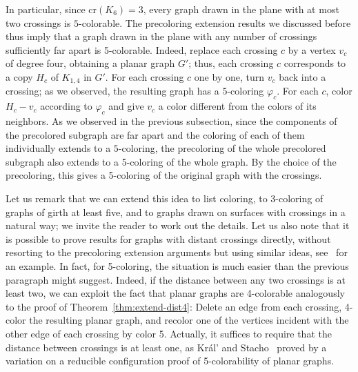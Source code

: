 \documentclass[12pt,twoside,openright,a4paper]{book}
\newcommand{\crs}{\text{cr}}
\begin{document}
In particular, since $\crs(K_6)=3$, every graph drawn in the plane with at most two crossings is $5$-colorable.
The precoloring extension results we discussed before thus imply that a graph drawn in the plane
with any number of crossings sufficiently far apart is 5-colorable.
Indeed, replace each crossing $c$ by a vertex $v_c$ of degree four, obtaining a planar graph $G'$; thus, each crossing $c$
corresponds to a copy $H_c$ of $K_{1,4}$ in $G'$.  For each crossing $c$ one by one, turn $v_c$ back into a crossing;
as we observed, the resulting graph has a $5$-coloring $\varphi_c$.  For each $c$, color $H_c-v_c$ according to $\varphi_c$
and give $v_c$ a color different from the colors of its neighbors.  As we observed in the previous subsection,
since the components of the precolored subgraph are far apart and the coloring of each of them individually extends to a $5$-coloring,
the precoloring of the whole precolored subgraph also extends to a 5-coloring of the whole graph.
By the choice of the precoloring, this gives a 5-coloring of the original graph with the crossings.

Let us remark that we can extend this idea to list coloring, to 3-coloring of graphs of girth at least five, and to graphs
drawn on surfaces with crossings in a natural way; we invite the reader to work out the details.  Let us also note that
it is possible to prove results for graphs with distant crossings directly, without resorting to the precoloring extension arguments
but using similar ideas, see~\cite{5choosfar} for an example.  In fact, for 5-coloring, the situation is much easier than the previous
paragraph might suggest.  Indeed, if the distance between any two crossings is at least two, we can exploit the fact that
planar graphs are 4-colorable analogously to the proof of Theorem~\ref{thm:extend-dist4}: Delete an edge from each crossing,
4-color the resulting planar graph, and recolor one of the vertices incident with the other edge of each crossing by color 5.
Actually, it suffices to require that the distance between crossings is at least one, as Kr\'al' and Stacho~\cite{krst}
proved by a variation on a reducible configuration proof of 5-colorability of planar graphs.
\end{document}
